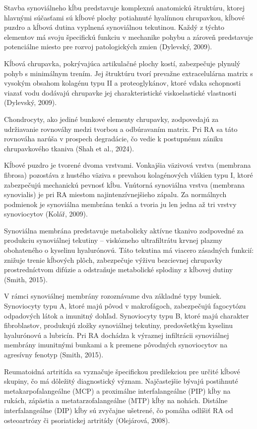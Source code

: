Stavba synoviálneho kĺbu predstavuje komplexnú anatomickú štruktúru, ktorej hlavnými súčasťami sú kĺbové plochy potiahnuté hyalínnou chrupavkou, kĺbové puzdro a kĺbová dutina vyplnená synoviálnou tekutinou. Každý z týchto elementov má svoju špecifickú funkciu v mechanike pohybu a zároveň predstavuje potenciálne miesto pre rozvoj patologických zmien (Dylevský, 2009). 

Kĺbová chrupavka, pokrývajúca artikulačné plochy kostí, zabezpečuje plynulý pohyb s minimálnym trením. Jej štruktúru tvorí prevažne extracelulárna matrix s vysokým obsahom kolagénu typu II a proteoglykánov, ktoré vďaka schopnosti viazať vodu dodávajú chrupavke jej charakteristické viskoelastické vlastnosti (Dylevský, 2009). 

Chondrocyty, ako jediné bunkové elementy chrupavky, zodpovedajú za udržiavanie rovnováhy medzi tvorbou a odbúravaním matrix. Pri RA sa táto rovnováha narúša v prospech degradácie, čo vedie k postupnému zániku chrupavkového tkaniva (Shah et al., 2024). 

Kĺbové puzdro je tvorené dvoma vrstvami. Vonkajšia väzivová vrstva (membrana fibrosa) pozostáva z hustého väziva s prevahou kolagénových vlákien typu I, ktoré zabezpečujú mechanickú pevnosť kĺbu. Vnútorná synoviálna vrstva (membrana synovialis) je pri RA miestom najintenzívnejšieho zápalu. Za normálnych podmienok je synoviálna membrána tenká a tvoria ju len jedna až tri vrstvy synoviocytov (Kolář, 2009). 



Synoviálna membrána predstavuje metabolicky aktívne tkanivo zodpovedné za produkciu synoviálnej tekutiny – viskózneho ultrafiltrátu krvnej plazmy obohateného o kyselinu hyalurónovú. Táto tekutina má viacero zásadných funkcií: znižuje trenie kĺbových plôch, zabezpečuje výživu bezcievnej chrupavky prostredníctvom difúzie a odstraňuje metabolické splodiny z kĺbovej dutiny (Smith, 2015). 

V rámci synoviálnej membrány rozoznávame dva základné typy buniek. Synoviocyty typu A, ktoré majú pôvod v makrofágoch, zabezpečujú fagocytózu odpadových látok a imunitný dohľad. Synoviocyty typu B, ktoré majú charakter fibroblastov, produkujú zložky synoviálnej tekutiny, predovšetkým kyselinu hyalurónovú a lubricín. Pri RA dochádza k výraznej infiltrácii synoviálnej membrány imunitnými bunkami a k premene pôvodných synoviocytov na agresívny fenotyp (Smith, 2015). 



Reumatoidná artritída sa vyznačuje špecifickou predilekciou pre určité kĺbové skupiny, čo má dôležitý diagnostický význam. Najčastejšie bývajú postihnuté metakarpofalangeálne (MCP) a proximálne interfalangeálne (PIP) kĺby na rukách, zápästia a metatarzofalangeálne (MTP) kĺby na nohách. Distálne interfalangeálne (DIP) kĺby sú zvyčajne ušetrené, čo pomáha odlíšiť RA od osteoartrózy či psoriatickej artritídy (Olejárová, 2008). 

